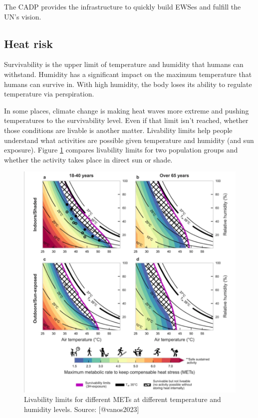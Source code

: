 \documentclass[
]{book}
\begin{document}
The CADP provides the infrastructure to quickly build EWSes and fulfill
the UN's vision.

\hypertarget{heat-risk}{%
\subsection{Heat risk}\label{heat-risk}}

Survivability is the upper limit of temperature and humidity that humans
can withstand. Humidity has a significant impact on the maximum temperature
that humans can survive in. With high humidity, the body loses its ability
to regulate temperature via perspiration.

In some places, climate change is making heat waves more extreme and pushing
temperatures to the survivability level.
Even if that limit isn't reached, whether those conditions are livable is
another matter.
Livability limits help people understand what activities are possible
given temperature and humidity (and sun exposure).
Figure \ref{fig:livability-limits}
compares livability limits for two population
groups and whether the activity takes place in direct sun or shade.

\begin{figure}

{\centering \includegraphics[width=12.97in]{images/livability_limits} 

}

\caption{Livability limits for different METs at different temperature and humidity levels. Source: [@vanos2023]}\label{fig:livability-limits}
\end{figure}
\end{document}
